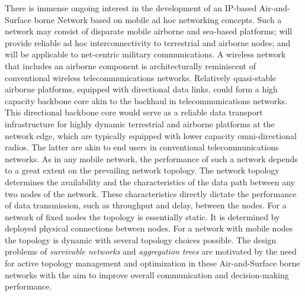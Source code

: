 There is immense ongoing interest in the development of an 
IP-based Air-and-Surface borne Network based on mobile ad hoc 
networking concepts. Such a network may consist of 
disparate mobile airborne and sea-based platforms; will provide reliable ad 
hoc interconnectivity to terrestrial and airborne nodes; and 
will be applicable to net-centric military communications. A 
wireless network that includes an airborne component is 
architecturally reminiscent of conventional wireless 
telecommunications networks. Relatively quasi-stable 
airborne platforms, equipped with directional data links, could 
form a high capacity backbone core akin to the backhaul in 
telecommunications networks. This directional backbone core 
would serve as a reliable data transport infrastructure for 
highly dynamic terrestrial and airborne platforms at the 
network edge, which are typically equipped with lower 
capacity omni-directional radios. The latter are akin to end 
users in conventional telecommunications networks.  
As in any mobile network, the performance of such a network 
depends to a great extent on the prevailing network topology. 
The network topology determines the availability and the 
characteristics of the data path between any two nodes of the 
network. These characteristics directly dictate the performance 
of data transmission, such as throughput and delay, between 
the nodes. For a network of fixed nodes the topology is 
essentially static. It is determined by deployed physical 
connections between nodes. For a network with mobile nodes 
the topology is dynamic with several topology choices 
possible. The design problems of {\em survivable networks} 
and {\em aggregation trees}  are motivated by the
need for active topology management and optimization in 
these Air-and-Surface borne networks with 
the aim to improve overall communication and decision-making performance. 

